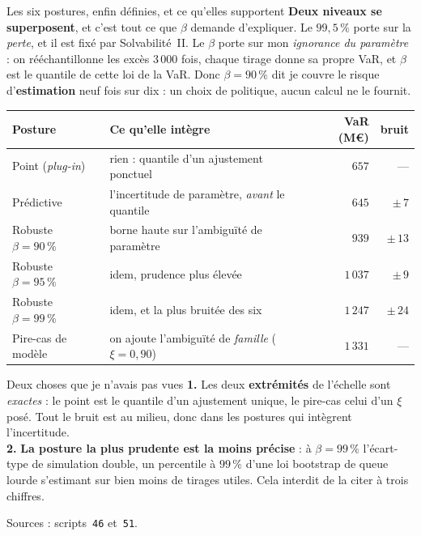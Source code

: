 \documentclass[11pt]{beamer}
\begin{document}
\begin{frame}{Les six postures, enfin définies, et ce qu'elles supportent}
\scriptsize
\textbf{Deux niveaux se superposent}, et c'est tout ce que $\beta$ demande d'expliquer. Le
$99{,}5\,\%$ porte sur la \emph{perte}, et il est fixé par Solvabilité~II. Le $\beta$ porte sur
mon \emph{ignorance du paramètre} : on rééchantillonne les excès $3\,000$ fois, chaque tirage
donne sa propre VaR, et $\beta$ est le quantile de cette loi de la VaR. Donc $\beta=90\,\%$ dit
\og je couvre le risque d'\textbf{estimation} neuf fois sur dix \fg{} : un choix de politique,
aucun calcul ne le fournit.
\vspace{-1mm}
\begin{center}\scriptsize
\begin{tabular}{@{}l l r r@{}}
\toprule
\textbf{Posture} & \textbf{Ce qu'elle intègre} & \textbf{VaR} (M\euro) & \textbf{bruit} \\
\midrule
Point (\emph{plug-in}) & rien : quantile d'un ajustement ponctuel & $657$ & --- \\
Prédictive & l'incertitude de paramètre, \emph{avant} le quantile & $645$ & $\pm\,7$ \\
Robuste $\beta=90\,\%$ & borne haute sur l'ambiguïté de paramètre & $939$ & $\pm\,13$ \\
Robuste $\beta=95\,\%$ & idem, prudence plus élevée & $1\,037$ & $\pm\,9$ \\
Robuste $\beta=99\,\%$ & idem, et la plus bruitée des six & $1\,247$ & $\pm\,24$ \\
Pire-cas de modèle & on ajoute l'ambiguïté de \emph{famille} ($\xi=0{,}90$) & $1\,331$ & --- \\
\bottomrule
\end{tabular}
\end{center}
\vspace{-1mm}
\begin{block}{Deux choses que je n'avais pas vues}
\textbf{1.} Les deux \textbf{extrémités} de l'échelle sont \emph{exactes} : le point est le
quantile d'un ajustement unique, le pire-cas celui d'un $\xi$ posé. Tout le bruit est au milieu,
donc dans les postures qui intègrent l'incertitude.\\[2pt]
\textbf{2.} \textbf{La posture la plus prudente est la moins précise} : à $\beta=99\,\%$
l'écart-type de simulation double, un percentile à $99\,\%$ d'une loi bootstrap de queue lourde
s'estimant sur bien moins de tirages utiles. Cela interdit de la citer à trois chiffres.
\end{block}
\vspace{-1mm}
{\scriptsize Sources : scripts~\texttt{46} et~\texttt{51}.}
\end{frame}
\end{document}
